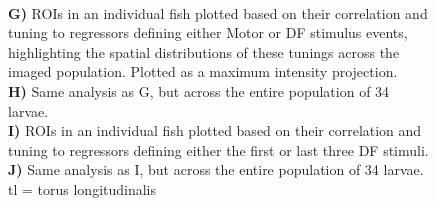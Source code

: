 \documentclass[9pt,lineno]{RandlettLab_elife}
\begin{document}
\begin{figure}
\begin{fullwidth}
\begin{center}
{\\ \textbf{G)} ROIs in an individual fish plotted based on their correlation and tuning to regressors defining either Motor or DF stimulus events, highlighting the spatial distributions of these tunings across the imaged population. Plotted as a maximum intensity projection. 
\\ \textbf{H)} Same analysis as G, but across the entire population of 34 larvae. 
\\ \textbf{I)} ROIs in an individual fish plotted based on their correlation and tuning to regressors defining either the first or last three DF stimuli. 
\\ \textbf{J)} Same analysis as I, but across the entire population of 34 larvae. tl = torus longitudinalis
}

\label{fig:1}

\label{fig:S1}
\end{center}
\end{fullwidth}
\end{figure}
\end{document}
